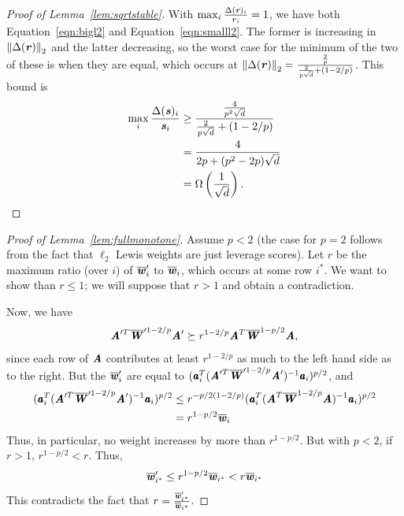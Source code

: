 \begin{proof}[Proof of Lemma~\ref{lem:sqrtstable}]
With $\max_i \frac{\Delta(\rr)_i}{\rr_i} = 1$, we have both
Equation~\ref{eqn:bigl2} and Equation~\ref{eqn:smalll2}.
The former is increasing in $\norm{\Delta(\rr)}_2$ and the latter decreasing,
so the worst case for the minimum of the two of these is when they are equal,
which occurs at $\norm{\Delta(\rr)}_2 = \frac{\frac{2}{p}}{\frac{2}{p \sqrt{d}} + (1-2/p)}$.
This bound is
\begin{align*}
\max_i \frac{\Delta(\ss)_i}{\ss_i} &\geq \frac{\frac{4}{p^2 \sqrt{d}}}{\frac{2}{p \sqrt{d}} + (1-2/p)} \\
&= \frac{4}{2p + (p^2-2p) \sqrt{d}} \\
&= \Omega \left ( \frac{1}{\sqrt{d}} \right ).
\end{align*}
\end{proof}

\begin{proof}[Proof of Lemma~\ref{lem:fullmonotone}]
Assume $p < 2$ (the case for $p=2$ follows from the fact
that $\ell_2$ Lewis weights are just leverage scores).
Let $r$ be the maximum ratio (over $i$) of $\wwbar'_i$ to $\wwbar_i$, which occurs at some row $i^*$.
We want to show than $r \leq 1$; we will suppose that $r > 1$ and obtain a contradiction.

Now, we have
\begin{equation*}
\AA'^T \WWbar'^{1-2/p} \AA' \succeq r^{1-2/p} \AA^T \WWbar^{1-p/2} \AA,
\end{equation*}
since each row of $\AA$ contributes at least $r^{1-2/p}$ as much to the left hand side as to the right.  But the
$\wwbar'_i$ are equal to $(\aa_i^T (\AA'^T \WWbar'^{1-2/p} \AA')^{-1} \aa_i)^{p/2}$, and
\begin{align*}
(\aa_i^T (\AA'^T \WWbar'^{1-2/p} \AA')^{-1} \aa_i)^{p/2} &\leq r^{-p/2 (1-2/p)} (\aa_i^T (\AA^T \WWbar^{1-2/p} \AA)^{-1} \aa_i)^{p/2} \\
&= r^{1-p/2} \wwbar_i
\end{align*}
Thus, in particular, no weight increases by more than $r^{1-p/2}$.  But with $p < 2$, if $r > 1$,
$r^{1-p/2} < r$.  Thus,
\begin{equation*}
\wwbar'_{i^*} \leq r^{1-p/2} \wwbar_{i^*} < r \wwbar_{i^*}
\end{equation*}
This contradicts the fact that $r = \frac{\wwbar'_{i^*}}{\wwbar_{i^*}}$.
\end{proof}

